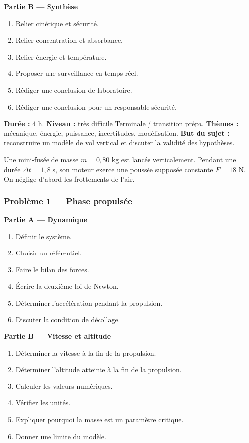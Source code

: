 \documentclass[11pt,a4paper]{article}
\begin{document}
\begin{difficile}
\textbf{Partie B — Synthèse}
\begin{enumerate}
  \item Relier cinétique et sécurité.
  \item Relier concentration et absorbance.
  \item Relier énergie et température.
  \item Proposer une surveillance en temps réel.
  \item Rédiger une conclusion de laboratoire.
  \item Rédiger une conclusion pour un responsable sécurité.
\end{enumerate}
\end{difficile}

\hypertarget{PC-EXCELLENCE-05}{}
\begin{difficile}
\textbf{Durée :} 4 h.  
\textbf{Niveau :} très difficile Terminale / transition prépa.  
\textbf{Thèmes :} mécanique, énergie, puissance, incertitudes, modélisation.  
\textbf{But du sujet :} reconstruire un modèle de vol vertical et discuter la validité des hypothèses.

\medskip

Une mini-fusée de masse $m=0{,}80$ kg est lancée verticalement. Pendant une durée $\Delta t=1{,}8$ s, son moteur exerce une poussée supposée constante $F=18$ N. On néglige d'abord les frottements de l'air.

\subsubsection*{Problème 1 — Phase propulsée}

\textbf{Partie A — Dynamique}
\begin{enumerate}
  \item Définir le système.
  \item Choisir un référentiel.
  \item Faire le bilan des forces.
  \item Écrire la deuxième loi de Newton.
  \item Déterminer l'accélération pendant la propulsion.
  \item Discuter la condition de décollage.
\end{enumerate}

\textbf{Partie B — Vitesse et altitude}
\begin{enumerate}
  \item Déterminer la vitesse à la fin de la propulsion.
  \item Déterminer l'altitude atteinte à la fin de la propulsion.
  \item Calculer les valeurs numériques.
  \item Vérifier les unités.
  \item Expliquer pourquoi la masse est un paramètre critique.
  \item Donner une limite du modèle.
\end{enumerate}


\end{difficile}
\end{document}
